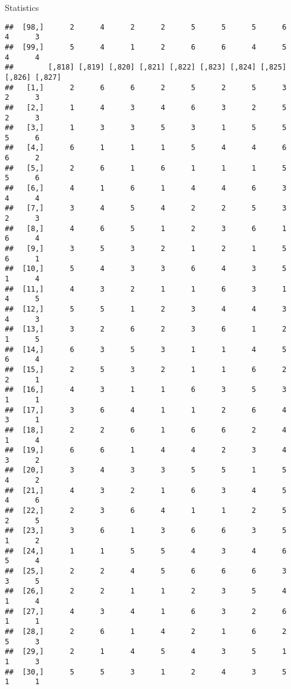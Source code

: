 \documentclass[
  ignorenonframetext,
]{beamer}
\begin{document}
\begin{frame}[fragile]{Statistics}
\begin{verbatim}
##  [98,]      2      4      2      2      5      5      5      6      4      3
##  [99,]      5      4      1      2      6      6      4      5      4      4
##        [,818] [,819] [,820] [,821] [,822] [,823] [,824] [,825] [,826] [,827]
##   [1,]      2      6      6      2      5      2      5      3      2      3
##   [2,]      1      4      3      4      6      3      2      5      2      3
##   [3,]      1      3      3      5      3      1      5      5      5      6
##   [4,]      6      1      1      1      5      4      4      6      6      2
##   [5,]      2      6      1      6      1      1      1      5      5      6
##   [6,]      4      1      6      1      4      4      6      3      4      4
##   [7,]      3      4      5      4      2      2      5      3      2      3
##   [8,]      4      6      5      1      2      3      6      1      6      4
##   [9,]      3      5      3      2      1      2      1      5      6      1
##  [10,]      5      4      3      3      6      4      3      5      1      4
##  [11,]      4      3      2      1      1      6      3      1      4      5
##  [12,]      5      5      1      2      3      4      4      3      4      3
##  [13,]      3      2      6      2      3      6      1      2      1      5
##  [14,]      6      3      5      3      1      1      4      5      6      4
##  [15,]      2      5      3      2      1      1      6      2      2      1
##  [16,]      4      3      1      1      6      3      5      3      1      1
##  [17,]      3      6      4      1      1      2      6      4      3      1
##  [18,]      2      2      6      1      6      6      2      4      1      4
##  [19,]      6      6      1      4      4      2      3      4      3      2
##  [20,]      3      4      3      3      5      5      1      5      4      2
##  [21,]      4      3      2      1      6      3      4      5      4      6
##  [22,]      2      3      6      4      1      1      2      5      2      5
##  [23,]      3      6      1      3      6      6      3      5      1      2
##  [24,]      1      1      5      5      4      3      4      6      5      4
##  [25,]      2      2      4      5      6      6      6      3      3      5
##  [26,]      2      2      1      1      2      3      5      4      1      4
##  [27,]      4      3      4      1      6      3      2      6      1      1
##  [28,]      2      6      1      4      2      1      6      2      5      3
##  [29,]      2      1      4      5      4      3      5      1      1      3
##  [30,]      5      5      3      1      2      4      3      5      1      1

\end{verbatim}
\end{frame}
\end{document}

